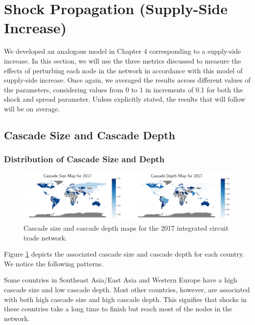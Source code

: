 \documentclass[12pt,letterpaper]{report}
\begin{document}
	\section{Shock Propagation (Supply-Side Increase)}
	\label{sec:54supplysideIncrease}
	
	We developed an analogous model in Chapter 4 corresponding to a supply-side increase. In this section, we will use the three metrics discussed to measure the effects of perturbing each node in the network in accordance with this model of supply-side increase. Once again, we averaged the results across different values of the parameters, considering values from 0 to 1 in increments of 0.1 for both the shock and spread parameter. Unless explicitly stated, the results that will follow will be on average.
	
	\subsection{Cascade Size and Cascade Depth}
	\label{ssec:541cascadeSizeDepth}
	
	\subsubsection{Distribution of Cascade Size and Depth}
	\label{ssec:5411distribution}
	
	\begin{figure}[!h]
		\centering
		\includegraphics[width=\textwidth]{Fig520-CascadeMap.png}
		\caption{Cascade size and cascade depth maps for the 2017 integrated circuit trade network.}\label{fig:519CascadeMap}
	\end{figure}
	
	Figure \ref{fig:519CascadeMap} depicts the associated cascade size and cascade depth for each country. We notice the following patterns.
	
	Some countries in Southeast Asia/East Asia and Western Europe have a high cascade size and low cascade depth. Most other countries, however, are associated with both high cascade size and high cascade depth. This signifies that shocks in these countries take a long time to finish but reach most of the nodes in the network.
	
\end{document}
